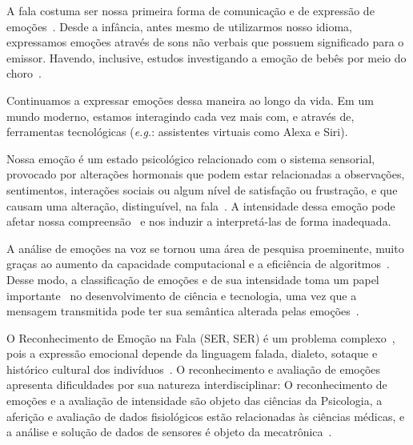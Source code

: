 

A fala costuma ser nossa primeira forma de comunicação e de expressão de emoções~\cite{1.5}. Desde a infância, antes mesmo de utilizarmos nosso idioma, expressamos emoções através de sons não verbais que possuem significado para o emissor. Havendo, inclusive, estudos investigando a emoção de bebês por meio do choro~\cite{0}.

Continuamos a expressar emoções dessa maneira ao longo da vida. Em um mundo moderno, estamos interagindo cada vez mais com, e através de, ferramentas tecnológicas (\textit{e.g.}: assistentes virtuais como Alexa e Siri).

Nossa emoção é um estado psicológico relacionado com o sistema sensorial, provocado por alterações hormonais que podem estar relacionadas a observações, sentimentos, interações sociais ou algum nível de satisfação ou frustração, e que causam uma alteração, distinguível, na fala~\cite{8}. A intensidade dessa emoção pode afetar nossa compreensão~\cite{18.46} e nos induzir a interpretá-las de forma inadequada.

A análise de emoções na voz se tornou uma área de pesquisa proeminente, muito graças ao aumento da capacidade computacional e a eficiência de algoritmos~\cite{38, 20}. Desse modo, a classificação de emoções e de sua intensidade toma um papel importante~\cite{3} no desenvolvimento de ciência e tecnologia, uma vez que a mensagem transmitida pode ter sua semântica alterada pelas emoções~\cite{39}.

O Reconhecimento de Emoção na Fala (\acrlong{SER}, \acrshort{SER}) é um problema complexo~\cite{complexidade1}, pois a expressão emocional depende da linguagem falada, dialeto, sotaque e histórico cultural dos indivíduos~\cite{6}. O reconhecimento e avaliação de emoções apresenta dificuldades por sua natureza interdisciplinar: O reconhecimento de emoções e a avaliação de intensidade são objeto das ciências da Psicologia, a aferição e avaliação de dados fisiológicos estão relacionadas às ciências médicas, e a análise e solução de dados de sensores é objeto da mecatrônica~\cite{17}.

